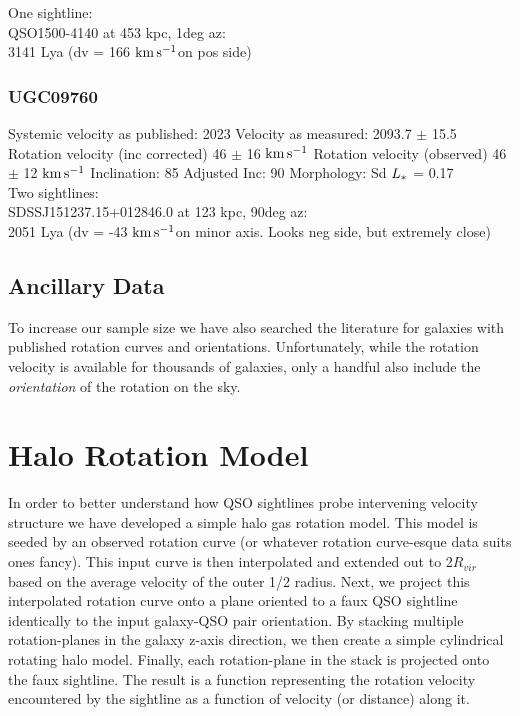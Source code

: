 \documentclass[iop]{emulateapj-rtx4}
\newcommand{\kms}{$\rm km\, s^{-1}$}
\begin{document}
One sightline: \\
QSO1500-4140 at 453 kpc, 1deg az: \\
3141 Lya (dv = 166 \kms on pos side)


\subsubsection{UGC09760}
Systemic velocity as published: 2023
Velocity as measured: 2093.7 $\pm$ 15.5
Rotation velocity (inc corrected) 46 $\pm$ 16 \kms
Rotation velocity (observed) 46 $\pm$ 12 \kms
Inclination: 85
Adjusted Inc: 90
Morphology: Sd
$L_{\**}$ = 0.17 \\

Two sightlines: \\
SDSSJ151237.15+012846.0 at 123 kpc, 90deg az: \\
2051 Lya (dv = -43 \kms on minor axis. Looks neg side, but extremely close)



\subsection{Ancillary Data}
To increase our sample size we have also searched the literature for galaxies with published rotation curves and orientations. Unfortunately, while the rotation velocity is available for thousands of galaxies, only a handful also include the \emph{orientation} of the rotation on the sky. 




\section{Halo Rotation Model}
In order to better understand how QSO sightlines probe intervening velocity structure we have developed a simple halo gas rotation model. This model is seeded by an observed rotation curve (or whatever rotation curve-esque data suits ones fancy). This input curve is then interpolated and extended out to 2$R_{vir}$ based on the average velocity of the outer 1/2 radius. Next, we project this interpolated rotation curve onto a plane oriented to a faux QSO sightline identically to the input galaxy-QSO pair orientation. By stacking multiple rotation-planes in the galaxy z-axis direction, we then create a simple cylindrical rotating halo model. Finally, each rotation-plane in the stack is projected onto the faux sightline. The result is a function representing the rotation velocity encountered by the sightline as a function of velocity (or distance) along it.
\end{document}
